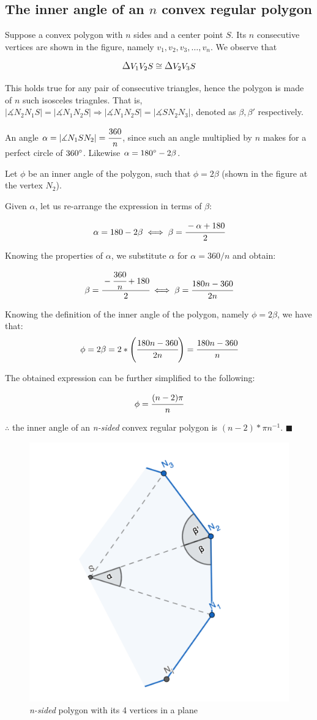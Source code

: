 \subsection{The inner angle of an $n$ convex regular polygon}

Suppose a convex polygon with $n$ sides and a center point $S$. Its $n$
consecutive vertices are shown in the figure, namely \(v_1, v_2, v_3, \dots,
v_n\). We observe that

\[
  \text{\large $\Delta$} V_1V_2S \cong \text{\large $\Delta$} V_2V_3S
\]

This holds true for any pair of consecutive triangles, hence the polygon
is made of $n$ such isosceles triagnles.
That is, $|\measuredangle N_2 N_1 S| = |\measuredangle N_1 N_2 S| \Rightarrow
|\measuredangle N_1 N_2 S| = |\measuredangle S N_2 N_3|$, denoted as \(\beta,
\beta\prime\) respectively.

An angle $\alpha = |\measuredangle N_1 S N_2| = \cfrac{360}{n}$, since such an angle multiplied by $n$ makes for a perfect circle of $360\degree$. 
Likewise $\alpha = 180\degree - 2 \beta$.

Let $\phi$ be an inner angle of the polygon, such that $\phi = 2 \beta$ (shown in the figure at the vertex $N_2$).

Given $\alpha$, let us re-arrange the expression in terms of $\beta$:

$$\alpha = 180 - 2 \beta \iff \beta = \cfrac{-\alpha + 180}{2}$$

Knowing the properties of $\alpha$, we substitute $\alpha$ for $\alpha = {360}/n$ and obtain:

$$\beta = \cfrac{-\cfrac{360}{n} + 180}{2} \iff \beta = \cfrac{180n - 360}{2n}$$

Knowing the definition of the inner angle of the polygon, namely $\phi = 2 \beta$, we have that:
$$\phi = 2 \beta = 2 \ast \Bigg( \cfrac{180n - 360}{2n} \Bigg) = \cfrac{180n - 360}{n}$$

The obtained expression can be further simplified to the following:

$$\phi = \cfrac{(n-2) \pi}{n}$$

$\therefore$ the inner angle of an \textit{n-sided} convex regular polygon is ${(n-2) \ast \pi}n^{-1}$. $\blacksquare$

\begin{figure}[htp]
    \centering
    \includegraphics[width=3.cm]{assets/polygon.png}
    \caption{\textit{n-sided} polygon with its 4 vertices in a plane}
\end{figure}
